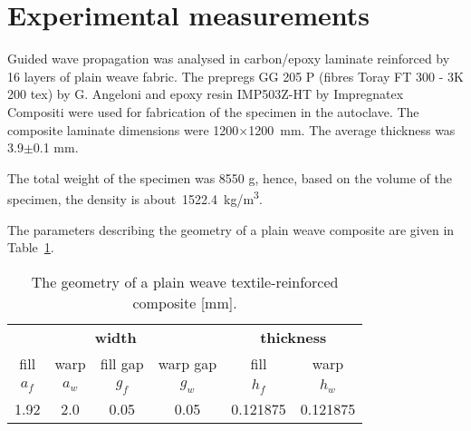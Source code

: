 \section{Experimental measurements \label{sec:experiment}}


Guided wave propagation was analysed in carbon/epoxy laminate  reinforced 
by 16 layers of plain weave fabric. The prepregs GG 205  P (fibres Toray FT 300 - 3K 
200 tex) by G. Angeloni and epoxy resin IMP503Z-HT by Impregnatex Compositi were 
used for fabrication of the specimen in the autoclave. The composite laminate 
dimensions were 1200\(\times\)1200~mm. The average thickness was 3.9\(\pm\)0.1 
mm. 

The total weight of the specimen was 8550 g, hence, based on the volume of the specimen, the density is about~1522.4~kg/m\textsuperscript{3}.

The parameters describing the geometry of a plain weave   composite are given in Table~\ref{tab:weave_geo}. 

 \begin{table}[h]
	\renewcommand{\arraystretch}{1.3}
	\centering \footnotesize
	\caption{The geometry of a plain weave textile-reinforced composite [mm].}
	\begin{tabular}{cccccc} 
		\toprule
		\multicolumn{4}{c}{\textbf{width} }	& \multicolumn{2}{c}{\textbf{thickness} }  \\ 
		\cmidrule(lr){1-4} \cmidrule(lr){5-6} 
		fill & warp & fill gap& warp gap& fill & warp\\
		\(a_f\) &\(a_w\)& \(g_f\)  & \(g_w\)  & \(h_f\)& \(h_w\) \\ 
		\cmidrule(lr){1-2} \cmidrule(lr){3-4} \cmidrule(lr){5-6}
		1.92 &2.0& 0.05& 0.05 & 0.121875 & 0.121875 \\
		\bottomrule 
	\end{tabular} 
	\label{tab:weave_geo}
\end{table}


\begin{figure} [h!]
	\centering
	\caption{}
	\label{fig:setup}
\end{figure}

